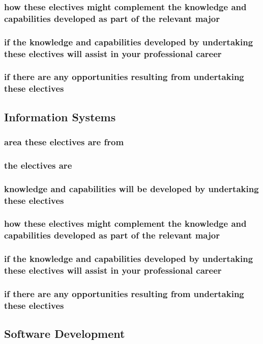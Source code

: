 \documentclass{article}
\begin{document}
		\subsubsection{how these electives might complement the knowledge and capabilities developed as part of the relevant major}
		\subsubsection{if the knowledge and capabilities developed by undertaking these electives will assist in your professional career}
		\subsubsection{if there are any opportunities resulting from undertaking these electives}
		\pagebreak
	\subsection{Information Systems}
		\subsubsection{area these electives are from}
		\subsubsection{the electives are}
		\subsubsection{knowledge and capabilities will be developed by undertaking these electives} 
		\subsubsection{how these electives might complement the knowledge and capabilities developed as part of the relevant major}
		\subsubsection{if the knowledge and capabilities developed by undertaking these electives will assist in your professional career}
		\subsubsection{if there are any opportunities resulting from undertaking these electives}
		\pagebreak
	\subsection{Software Development}
\end{document}
